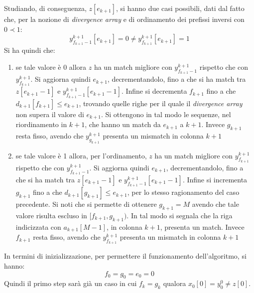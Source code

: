 \begin{enumerate}
  Studiando, di conseguenza, $z[e_{k+1}]$, si hanno due casi possibili, dati dal
  fatto che, per la nozione di \textit{divergence array} e di ordinamento dei
  prefissi inversi con $0\prec 1$:
  \begin{equation}
    \label{eq:pbwtsmem4}
    y_{f_{k+1}-1}^{k+1}[e_{k+1}]=0\neq y_{f_{k+1}}^{k+1}[e_{k+1}]=1
  \end{equation}
  Si ha quindi che:
  \begin{enumerate}
    \item se tale valore è 0 allora $z$ ha un match migliore
    con $y_{f_{k+1}-1}^{k+1}$ rispetto che con $y_{f_{k+1}}^{k+1}$. Si aggiorna
    quindi $e_{k+1}$, decrementandolo, fino a che si ha match tra $z[e_{k+1}-1]$
    e $y_{f_{k+1}-1}^{k+1}[e_{k+1}-1]$. Infine si decrementa $f_{k+1}$ fino a
    che $d_{k+1}[f_{k+1}]\leq e_{k+1}$, trovando quelle righe per il quale il
    \textit{divergence array} non supera il valore di $e_{k+1}$. Si ottengono in
    tal modo le sequenze, nel riordinamento in $k+1$, che hanno un match da
    $e_{k+1}$ a $k+1$. Invece $g_{k+1}$ resta fisso, avendo che
    $y_{g_{k+1}}^{k+1}$ presenta un
    mismatch in colonna $k+1$
    \item se tale valore è 1 allora, per l'ordinamento, $z$ ha un match migliore
    con $y_{f_{k+1}}^{k+1}$ rispetto che con $y_{f_{k+1}-1}^{k+1}$. Si aggiorna
    quindi $e_{k+1}$, decrementandolo, fino a che si ha match tra $z[e_{k+1}-1]$
    e $y_{f_{k+1}-1}^{k+1}[e_{k+1}-1]$. Infine si incrementa $g_{k+1}$ fino a
    che $d_{k+1}[g_{k+1}]\leq e_{k+1}$, per lo stesso ragionamento del caso
    precedente. Si noti che si permette di ottenere $g_{k+1}=M$ avendo che tale
    valore risulta escluso in $[f_{k+1},g_{k+1})$. In tal modo si segnala che la
    riga indicizzata con $a_{k+1}[M-1]$, in colonna $k+1$, presenta un
    match. Invece $f_{k+1}$ resta fisso, avendo che $y_{f_{k+1}}^{k+1}$ 
    presenta un mismatch in colonna $k+1$ 
  \end{enumerate}
\end{enumerate}
In termini di inizializzazione, per permettere il funzionamento dell'algoritmo,
si hanno: 
\[f_0=g_0=e_0=0\]
Quindi il primo step sarà già un caso in cui $f_k=g_k$ qualora $x_0[0]=y_0^0\neq
z[0]$. 
